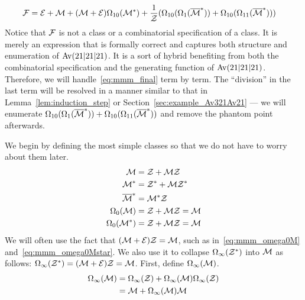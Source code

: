 \documentclass[12pt, a4paper, twoside]{report}
\begin{document}
\begin{align}
  \mathcal{F} &= \mathcal{E} + \mathcal{M} + (\mathcal{M}+\mathcal{E})\Omega_{10}(\mathcal{M}^*) +\frac{1}{\mathcal{Z}}(\Omega_{10}(\Omega_1(\overline{\mathcal{M}}^*)) + \Omega_{10}(\Omega_{11}(\overline{\mathcal{M}}^*)))
\label{eq:mmm_final}
\end{align}
Notice that $\mathcal{F}$ is not a class or a combinatorial specification of a class. It is merely an expression that is formally correct and captures both structure and enumeration of $\mathrm{Av}(21|21|21)$. It is a sort of hybrid benefiting from both the combinatorial specification and the generating function of $\mathrm{Av}(21|21|21)$. Therefore, we will handle~\eqref{eq:mmm_final} term by term. The ``division'' in the last term will be resolved in a manner similar to that in Lemma~\ref{lem:induction_step} or Section~\ref{sec:example_Av321Av21} --- we will enumerate $\Omega_{10}(\Omega_1(\overline{\mathcal{M}}^*)) + \Omega_{10}(\Omega_{11}(\overline{\mathcal{M}}^*))$ and remove the phantom point afterwards. 

We begin by defining the most simple classes so that we do not have to worry about them later. 
\begin{align}
  \mathcal{M} &= \mathcal{Z} + \mathcal{M}\mathcal{Z} \label{eq:mmm_m}\\
  \mathcal{M}^* &=  \mathcal{Z}^* + \mathcal{M}\mathcal{Z}^* \label{eq:mmm_Mstar}\\
  \overline{\mathcal{M}}^* &= \mathcal{M}^*\mathcal{Z} \label{eq:mmm_barMstar}\\
  \Omega_0(\mathcal{M})&= \mathcal{Z} + \mathcal{M}\mathcal{Z} = \mathcal{M}\label{eq:mmm_omega0M}\\
  \Omega_0(\mathcal{M}^*) &= \mathcal{Z} + \mathcal{M}\mathcal{Z} = \mathcal{M}\label{eq:mmm_omega0Mstar}
\end{align}
We will often use the fact that $(\mathcal{M}+\mathcal{E})\mathcal{Z} = \mathcal{M}$, such as in~\eqref{eq:mmm_omega0M} and~\eqref{eq:mmm_omega0Mstar}. We also use it to collapse $\Omega_\infty(\mathcal{Z}^*)$ into $\mathcal{M}$ as follows: $\Omega_\infty(\mathcal{Z}^*) = (\mathcal{M}+\mathcal{E})\mathcal{Z} = \mathcal{M}$. First, define $\Omega_\infty(\mathcal{M})$. 
\begin{align}
  \begin{aligned}
    \Omega_\infty(\mathcal{M}) &= \Omega_\infty(\mathcal{Z}) + \Omega_\infty(\mathcal{M})\Omega_\infty(\mathcal{Z})\\
    &= \mathcal{M} + \Omega_\infty(\mathcal{M})\mathcal{M}
  \end{aligned}
      \label{eq:mmm_omegainfty}
\end{align}
\end{document}
